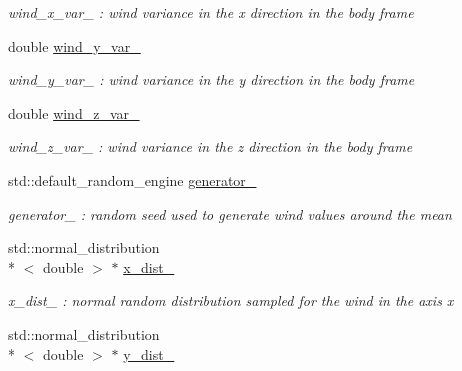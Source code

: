 \begin{DoxyCompactItemize}
\begin{DoxyCompactList}\small\item\em wind\-\_\-x\-\_\-var\-\_\- \-: wind variance in the x direction in the body frame \end{DoxyCompactList}\item 
\hypertarget{class_pose_controller_node_a3d49baddd844e397a10611db3724ee27}{double \hyperlink{class_pose_controller_node_a3d49baddd844e397a10611db3724ee27}{wind\-\_\-y\-\_\-var\-\_\-}}\label{class_pose_controller_node_a3d49baddd844e397a10611db3724ee27}

\begin{DoxyCompactList}\small\item\em wind\-\_\-y\-\_\-var\-\_\- \-: wind variance in the y direction in the body frame \end{DoxyCompactList}\item 
\hypertarget{class_pose_controller_node_a2459369e1bc7320f5d1b41d50bff8dfe}{double \hyperlink{class_pose_controller_node_a2459369e1bc7320f5d1b41d50bff8dfe}{wind\-\_\-z\-\_\-var\-\_\-}}\label{class_pose_controller_node_a2459369e1bc7320f5d1b41d50bff8dfe}

\begin{DoxyCompactList}\small\item\em wind\-\_\-z\-\_\-var\-\_\- \-: wind variance in the z direction in the body frame \end{DoxyCompactList}\item 
\hypertarget{class_pose_controller_node_af87e0bdbeeb0f46fd0c31e374de93ee3}{std\-::default\-\_\-random\-\_\-engine \hyperlink{class_pose_controller_node_af87e0bdbeeb0f46fd0c31e374de93ee3}{generator\-\_\-}}\label{class_pose_controller_node_af87e0bdbeeb0f46fd0c31e374de93ee3}

\begin{DoxyCompactList}\small\item\em generator\-\_\- \-: random seed used to generate wind values around the mean \end{DoxyCompactList}\item 
\hypertarget{class_pose_controller_node_a98be4a3953e8cc51fcf3aadd8235dcac}{std\-::normal\-\_\-distribution\\*
$<$ double $>$ $\ast$ \hyperlink{class_pose_controller_node_a98be4a3953e8cc51fcf3aadd8235dcac}{x\-\_\-dist\-\_\-}}\label{class_pose_controller_node_a98be4a3953e8cc51fcf3aadd8235dcac}

\begin{DoxyCompactList}\small\item\em x\-\_\-dist\-\_\- \-: normal random distribution sampled for the wind in the axis x \end{DoxyCompactList}\item 
\hypertarget{class_pose_controller_node_a1f9558e24d78ed4bc54afcd5994fae3d}{std\-::normal\-\_\-distribution\\*
$<$ double $>$ $\ast$ \hyperlink{class_pose_controller_node_a1f9558e24d78ed4bc54afcd5994fae3d}{y\-\_\-dist\-\_\-}}\label{class_pose_controller_node_a1f9558e24d78ed4bc54afcd5994fae3d}


\end{DoxyCompactItemize}

